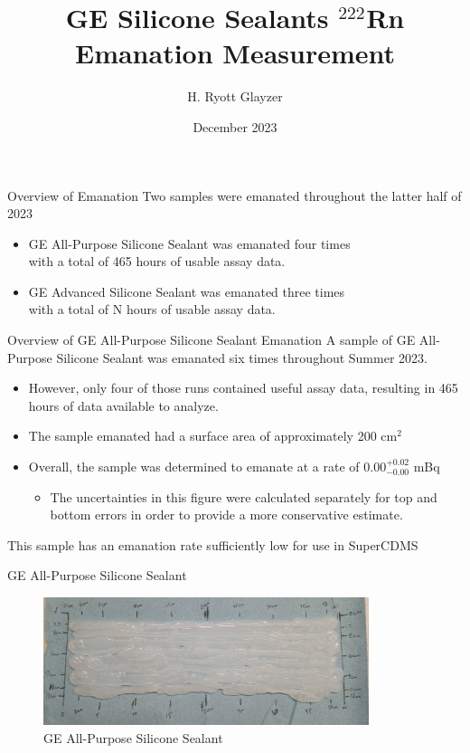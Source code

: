 \documentclass[aspectratio=169]{beamer}
\title{GE Silicone Sealants $^{222}$Rn Emanation Measurement}
\author[H. R. Glayzer]{H. Ryott Glayzer}
\institute[SDSMT]
{Lab Assistant\\
    SD Mines}
\date[2023]{December 2023}
\begin{document}
\frame{\titlepage}

\begin{frame}{Overview of Emanation}
    Two samples were emanated throughout the latter half of 2023
    \begin{itemize}
        \item GE All-Purpose Silicone Sealant was emanated four times\\
            with a total of 465 hours of usable assay data.
        \item GE Advanced Silicone Sealant was emanated three times\\
            with a total of N hours of usable assay data.
    \end{itemize}
\end{frame}

\begin{frame}{Overview of GE All-Purpose Silicone Sealant Emanation}
    A sample of GE All-Purpose Silicone Sealant was emanated six times throughout Summer 2023.
        \begin{itemize}
            \item However, only four of those runs contained useful assay data,\@
                resulting in 465 hours of data available to analyze.
            \item The sample emanated had a surface area of approximately 200 cm$^{2}$
            \item Overall, the sample was determined to emanate at a rate of 0.00$^{+0.02}_{-0.00}$ mBq
            \begin{itemize}
                \item The uncertainties in this figure were calculated separately for top\@
                    and bottom errors in order to provide a more conservative estimate.
            \end{itemize}
        \end{itemize}
    This sample has an emanation rate sufficiently low for use in SuperCDMS
\end{frame}

\begin{frame}{GE All-Purpose Silicone Sealant}
    \begin{figure}
         \centering
        \includegraphics[width=0.85\textwidth]{assets/all-purpose-sample.png}
        \caption{GE All-Purpose Silicone Sealant}
    \end{figure}
\end{frame}
\end{document}
